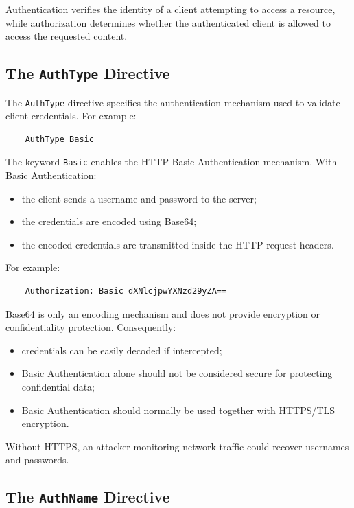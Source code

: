 \documentclass{scrbook}
\begin{document}
	Authentication verifies the identity of a client attempting to access a resource, while authorization determines whether the authenticated client is allowed to access the requested content.
	
	\subsection{The \texttt{AuthType} Directive}
	
	The \texttt{AuthType} directive specifies the authentication mechanism used to validate client credentials. For example:
	
	\begin{lstlisting}
	AuthType Basic
	\end{lstlisting}
	
	The keyword \texttt{Basic} enables the HTTP Basic Authentication mechanism. With Basic Authentication:
	\begin{itemize}
		\item the client sends a username and password to the server;
		
		\item the credentials are encoded using Base64;
		
		\item the encoded credentials are transmitted inside the HTTP request headers.
	\end{itemize}
	
	For example:
	
	\begin{lstlisting}
	Authorization: Basic dXNlcjpwYXNzd29yZA==
	\end{lstlisting}
	
	Base64 is only an encoding mechanism and does not provide encryption or confidentiality protection. Consequently:
	\begin{itemize}
		\item credentials can be easily decoded if intercepted;
		
		\item Basic Authentication alone should not be considered secure for protecting confidential data;
		
		\item Basic Authentication should normally be used together with HTTPS/TLS encryption.
	\end{itemize}
	
	Without HTTPS, an attacker monitoring network traffic could recover usernames and passwords.
	
	\subsection{The \texttt{AuthName} Directive}
	
\end{document}
